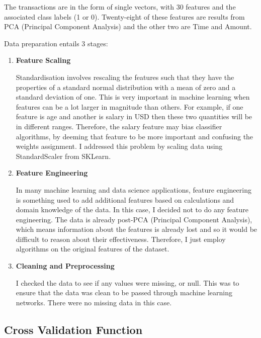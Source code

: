 \documentclass[12pt,a4paper,twoside]{report}
\begin{document}
The transactions are in the form of single vectors, with 30 features and the associated class labels (1 or 0). Twenty-eight of these features are results from PCA (Principal Component Analysis) and the other two are Time and Amount. 

Data preparation entails 3 stages:
\begin{enumerate}
\item \textbf{Feature Scaling}

Standardisation involves rescaling the features such that they have the properties of a standard normal distribution with a mean of zero and a standard deviation of one. This is very important in machine learning when features can be a lot larger in magnitude than others. For example, if one feature is age and another is salary in USD then these two quantities will be in different ranges. Therefore, the salary feature may bias classifier algorithms, by deeming that feature to be more important and confusing the weights assignment. 
I addressed this problem by scaling data using StandardScaler from SKLearn. 

\item \textbf{Feature Engineering}

In many machine learning and data science applications, feature engineering is something used to add additional features based on calculations and domain knowledge of the data. In this case, I decided not to do any feature engineering. The data is already post-PCA (Principal Component Analysis), which means information about the features is already lost and so it would be difficult to reason about their effectiveness. Therefore, I just employ algorithms on the original features of the dataset.

\item \textbf{Cleaning and Preprocessing}

I checked the data to see if any values were missing, or null. This was to ensure that the data was clean to be passed through machine learning networks. There were no missing data in this case.

\end{enumerate}

\subsection{Cross Validation Function}
\end{document}
